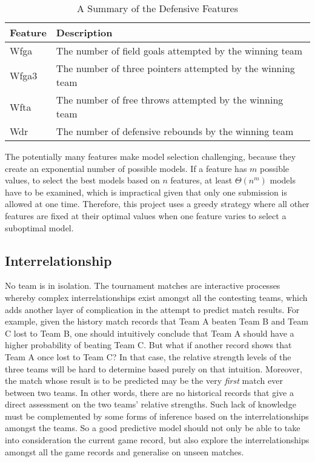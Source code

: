 \begin{table}[h!]
\centering
\begin{tabular}{ | l | l | }
\hline
\textbf{Feature} & \textbf{Description} \\ \hline
Wfga & The number of field goals attempted by the winning team \\ \hline
Wfga3 & The number of three pointers attempted by the winning team\\ \hline
Wfta & The number of free throws attempted by the winning team\\ \hline
Wdr & The number of defensive rebounds by the winning team \\ \hline
\end{tabular}
\caption{A Summary of the Defensive Features}\label{Ta:defensive_feature}
\end{table}

The potentially many features make model selection challenging, because they create an exponential number of possible models. If a feature has $m$ possible values, to select the best models based on $n$ features, at least $\Theta(n^{m})$ models have to be examined, which is impractical given that only one submission is allowed at one time. Therefore, this project uses a greedy strategy where all other features are fixed at their optimal values when one feature varies to select a suboptimal model. 

\subsection{Interrelationship}

No team is in isolation. The tournament matches are interactive processes whereby complex interrelationships exist amongst all the contesting teams, which adds another layer of complication in the attempt to predict match results. For example, given the history match records that Team A beaten Team B and Team C lost to Team B, one should intuitively conclude that Team A should have a higher probability of beating Team C. But what if another record shows that Team A once lost to Team C? In that case, the relative strength levels of the three teams will be hard to determine based purely on that intuition. Moreover, the match whose result is to be predicted may be the very \emph{first} match ever between two teams. In other words, there are no historical records that give a direct assessment on the two teams' relative strengths. Such lack of knowledge must be complemented by some forms of inference based on the interrelationships amongst the teams. So a good predictive model should not only be able to take into consideration the current game record, but also explore the interrelationships amongst all the game records and generalise on unseen matches. 


